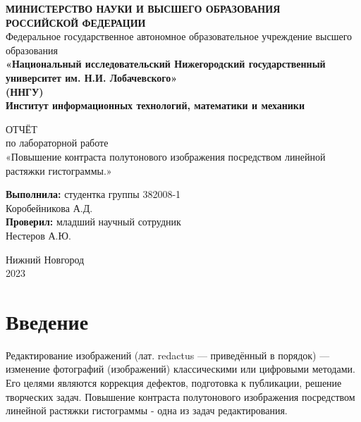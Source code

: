 \documentclass[14pt, russian]{extarticle}
\title{}
\author{}
\date{}
\begin{document}
	\begin{titlepage}
		\begin{center}
			{\bfseries МИНИСТЕРСТВО НАУКИ И ВЫСШЕГО ОБРАЗОВАНИЯ \\
				РОССИЙСКОЙ ФЕДЕРАЦИИ}
			\\
			Федеральное государственное автономное образовательное учреждение высшего образования 
			\\
			{\bfseries «Национальный исследовательский Нижегородский государственный университет им. Н.И. Лобачевского»\\(ННГУ)
				\\Институт информационных технологий, математики и механики} \\
		\end{center}
		
		\vspace{8em}
		
		\begin{center}
			ОТЧЁТ \\ по лабораторной работе \\
			«Повышение контраста полутонового изображения посредством линейной растяжки гистограммы.»
		\end{center}
		
		\vspace{5em}
		
		
		\begin{flushright}
			{\bfseries Выполнила:} студентка группы 382008-1\\Коробейникова А.Д.\\ 
			{\bfseries Проверил:} младший научный сотрудник\\Нестеров А.Ю.
		\end{flushright}
		
		
		\vspace{\fill}
		
		\begin{center}
			Нижний Новгород\\2023
		\end{center}
		
	\end{titlepage}
	
	\tableofcontents
	\thispagestyle{empty}
	\newpage
	
	\pagestyle{plain}
	\setcounter{page}{3}

	\section{Введение}
    Редактирование изображений (лат. redactus — приведённый в порядок) — изменение фотографий (изображений) классическими или цифровыми методами. Его целями являются коррекция дефектов, подготовка к публикации, решение творческих задач. Повышение контраста полутонового изображения посредством линейной растяжки гистограммы - одна из задач редактирования.
\end{document}

